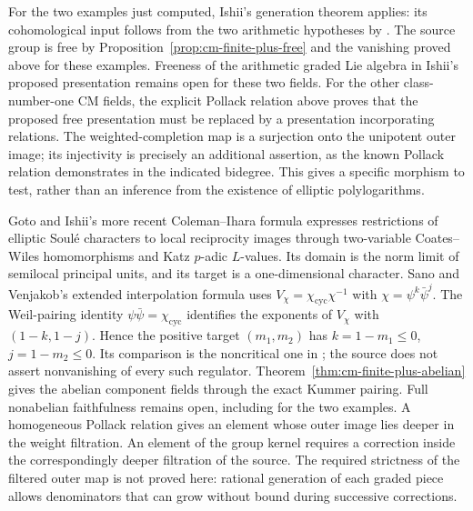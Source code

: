 For the two examples just computed, Ishii's generation theorem
applies: its cohomological input follows from the two arithmetic
hypotheses by \cite[Lemma 1.5, p.~3]{IshiiLie}.
The source group is free by Proposition~\ref{prop:cm-finite-plus-free}
and the vanishing proved above for these examples. Freeness of the
arithmetic graded Lie algebra in Ishii's proposed presentation remains
open for these two fields.
For the other class-number-one CM fields, the explicit Pollack
relation above proves that the proposed free presentation must
be replaced by a presentation incorporating relations.
The weighted-completion map is a surjection onto the unipotent
outer image; its injectivity is precisely an additional assertion,
as the known Pollack relation demonstrates in the indicated
bidegree. This gives a specific morphism to test, rather than
an inference from the existence of elliptic polylogarithms.

Goto and Ishii's more recent Coleman--Ihara formula
\cite[Theorem 1.1 and Corollary 5.5]{GotoIshii2026}
expresses restrictions of elliptic Soul\'e characters to local
reciprocity images through two-variable Coates--Wiles
homomorphisms and Katz \(p\)-adic \(L\)-values. Its domain is the
norm limit of semilocal principal units, and its target is a
one-dimensional character. Sano and Venjakob's extended
interpolation formula
\cite[Theorem 1.2.1, p.~3, and Theorem 2.4.1, p.~8]{SanoVenjakob2026}
uses \(V_\chi=\chi_{\mathrm{cyc}}\chi^{-1}\) with
\(\chi=\psi^k\bar\psi^j\). The Weil-pairing identity
\(\psi\bar\psi=\chi_{\mathrm{cyc}}\) identifies the exponents of
\(V_\chi\) with \((1-k,1-j)\). Hence the positive target
\((m_1,m_2)\) has \(k=1-m_1\leq0\), \(j=1-m_2\leq0\).
Its comparison is the noncritical one in
\cite[Corollary 2.4.7, pp.~9--10]{SanoVenjakob2026};
the source does not assert nonvanishing of every such regulator.
Theorem~\ref{thm:cm-finite-plus-abelian} gives the abelian component
fields through the exact Kummer pairing. Full nonabelian faithfulness
remains open, including for the two examples. A homogeneous Pollack
relation gives an element whose outer image lies deeper in the
weight filtration. An element of the group kernel requires a correction
inside the correspondingly deeper filtration of the source. The required
strictness of the filtered outer map is not proved here: rational
generation of each graded piece allows denominators that can grow
without bound during successive corrections.
